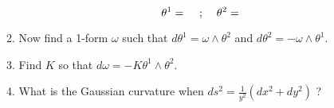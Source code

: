 \begin{enumerate}
\begin{enumerate}
\[ \theta^1 = \;\;\;\;\;\\;\;\;\;\; \theta^2 = \]

\item Now find a 1-form $\omega$ such that 
$d\theta^1 = \omega \wedge \theta^2$ and 
$d\theta^2 = -\omega \wedge \theta^1$.

\item Find $K$ so that $d\omega = -K \theta^1 \wedge \theta^2$.

\item What is the Gaussian curvature when 
$ds^2 = \frac{1}{y^2}(dx^2 + dy^2)$ ?
\end{enumerate} 

\end{enumerate}






